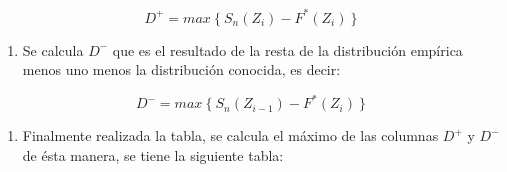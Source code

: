 \documentclass[
  a4paper,
  oneside,
  openany]{book}
\providecommand{\tightlist}{%
  \setlength{\itemsep}{0pt}\setlength{\parskip}{0pt}}
\begin{document}
\[D^+= max\ \{ \ S_{n}(Z_{i})-F^*(Z_{i}) \ \}\]

\begin{enumerate}
\def\labelenumi{\arabic{enumi})}
\setcounter{enumi}{6}
\tightlist
\item
  Se calcula \(D^-\) que es el resultado de la resta de la distribución empírica menos uno menos la distribución conocida, es decir:
\end{enumerate}

\[D^-= max\ \{\ S_{n}(Z_{i-1})-F^*(Z_{i}) \ \}\]

\begin{enumerate}
\def\labelenumi{\arabic{enumi})}
\setcounter{enumi}{7}
\tightlist
\item
  Finalmente realizada la tabla, se calcula el máximo de las columnas \(D^+\) y \(D^-\) de ésta manera, se tiene la siguiente tabla:
\end{enumerate}
\end{document}
